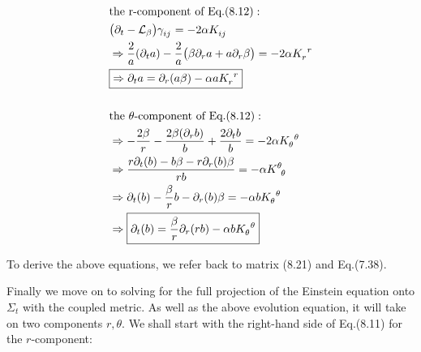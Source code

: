 \documentclass[12pt]{article}
\numberwithin{equation}{section}
\numberwithin{theorem}{subsection}
\begin{document}
\begin{align}

    &\textrm{the r-component of Eq.(8.12)}: \notag \\

    &\big(\partial_{t}-\mathcal{L}_{\beta} \big)\tensor{\gamma}{_i_j} = -2\alpha\tensor{K}{_i_j} \notag \\

    &\Rightarrow \frac{2}{a}(\partial_{t}a) -\frac{2}{a}\big(\beta \partial_{r}a + a\partial_{r}\beta \big) = -2\alpha \tensor{K}{_r^r} \notag \\

    &\boxed{\Rightarrow\partial_{t}a = \partial_{r}(a\beta) - \alpha a \tensor{K}{_r^r}} \\

    \notag \\

    &\textrm{the $\theta$-component of Eq.(8.12)}: \notag \\

    &\Rightarrow -\frac{2\beta}{r} - \frac{2\beta(\partial_{r}b)}{b} + \frac{2 \partial_{t}b}{b} = -2\alpha \tensor{K}{_\theta^\theta} \notag \\

    &\Rightarrow \frac{r\partial_{t}(b) - b\beta -r\partial_{r}(b)\beta}{rb} = -\alpha \tensor{K}{^\theta_\theta} \notag \\

    &\Rightarrow \partial_{t}(b) - \frac{\beta}{r}b - \partial_{r}(b)\beta = -\alpha b \tensor{K}{_\theta^\theta} \notag \\

    &\Rightarrow \boxed{\partial_{t}(b) = \frac{\beta}{r}\partial_{r}(rb) - \alpha b \tensor{K}{_\theta^\theta}}

\end{align}

To derive the above equations, we refer back to matrix (8.21) and Eq.(7.38).

\smallskip \newline Finally we move on to solving for the full projection of the Einstein equation onto $\Sigma_{t}$ with the coupled metric. As well as the above evolution equation, it will take on two components $r,\theta$. We shall start with the right-hand side of Eq.(8.11) for the $r$-component:
\end{document}

